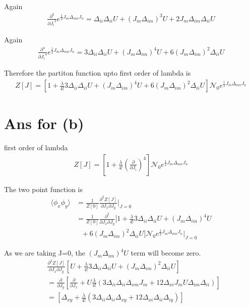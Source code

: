 \documentclass[12pt, letterpaper]{article}
\newcommand*{\1}{\hspace{1pt}}
\begin{document}
    Again    
    \begin{equation}
    \begin{split}
        \frac{\partial^3}{{\partial J_{i}}^3} e^{\frac{1}{2}J_{m}\Delta_{mn}J_{n}} = \Delta_{ii}\Delta_{ii}U + (J_{m}\Delta_{im})^{3} U + 2J_{m}\Delta_{im}\Delta_{ii} U 
    \end{split}
    \end{equation}

Again    
    \begin{equation}
    \begin{split}
        \frac{\partial^4}{{\partial J_{i}}^4} e^{\frac{1}{2}J_{m}\Delta_{mn}J_{n}} = 3\Delta_{ii}\Delta_{ii}U + (J_{m}\Delta_{im})^{4} U + 6(J_{m}\Delta_{im})^{2}\Delta_{ii} U 
    \end{split}
    \end{equation}

    Therefore the partiton function upto first order of lambda is
    \begin{align}
        Z[J] = [1+\frac{\lambda}{4!}3\Delta_{ii}\Delta_{ii}U + (J_{m}\Delta_{im})^{4} U + 6(J_{m}\Delta_{im})^{2}\Delta_{ii} U]\mathcal{N{_0}}e^{\frac{1}{2}J_{m}\Delta_{mn}J_{n}}
    \end{align}
    
    \section*{Ans for (b)}

     first order of lambda 
    \begin{align}
        Z[J] = [1 + \frac{\lambda}{4!}(\frac{\partial}{\partial J_{i}})^{4}]\mathcal{N}_{0} e^{\frac{1}{2} J_{m} \Delta _{mn} J_{n}}
    \end{align}


    The two point function is
    \begin{align*}
        \langle \phi_{x}\phi_{y} \rangle & = \frac{1}{Z[0]}\frac{\partial ^2 Z[J]}{\partial J_{x} \partial J_{y}}\Biggr|_{J=0} \\
        & =  \frac{1}{Z[0]}\frac{\partial ^2 }{\partial J_{x} \partial J_{y}}  [1+\frac{\lambda}{4!}3\Delta_{ii}\Delta_{ii}U + (J_{m}\Delta_{im})^{4} U \\
        & \ \ \  + 6(J_{m}\Delta_{im})^{2}\Delta_{ii} U]\mathcal{N}_{0} e^{\frac{1}{2} J_{m} \Delta _{mn} J_{n}}\Biggr|_{J=0}
    \end{align*}

    As we are taking J=0, the  $(J_{m}\Delta_{im})^{4} U$ term will become zero.
    \begin{align*}
         &\frac{\partial ^2 Z[J]}{\partial J_{x} \partial J_{y}}  [U+\frac{\lambda}{4!}3\Delta_{ii}\Delta_{ii}U + (J_{m}\Delta_{im})^{2}\Delta_{ii} U] \\
         & = \frac{\partial }{\partial J_{y}}[\frac{\partial}{\partial J_{x}} + U \frac{\lambda}{4!}(3\Delta_{ii}\Delta_{ii}\Delta_{xm}J_{m} + 12\Delta_{xi}J_{m}U\Delta_{im}\Delta_{ii})] \\ 
         & = [\Delta_{xy} + \frac{\lambda}{4!}(3\Delta_{ii}\Delta_{ii}\Delta_{xy} + 12\Delta_{xi}\Delta_{ii}\Delta_{iy})]
    \end{align*}
\end{document}
